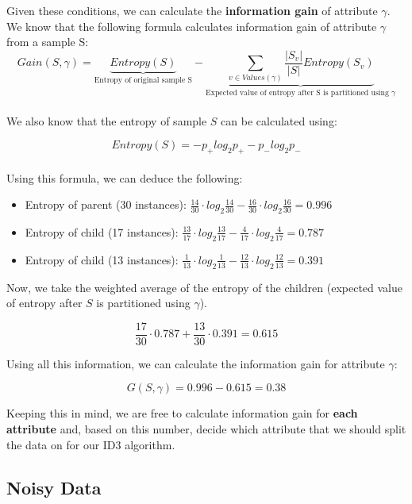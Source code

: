 \documentclass[english, 10pt]{article}
\begin{document}
{\begin{tikzpicture}[x=0.75pt,y=0.75pt,yscale=-1,xscale=1]
\end{tikzpicture}


}

\hfill \break Given these conditions, we can calculate the \textbf{information gain} of attribute $\gamma$.\\

We know that the following formula calculates information gain of attribute $\gamma$ from a sample S:\\

$$Gain(S,\gamma)=\underbrace{Entropy(S)}_{\text{Entropy of original sample S}}-\underbrace{\sum_{v\in Values(\gamma)}{\frac{|S_v|}{|S|}Entropy(S_v)}}_{\text{Expected value of entropy after S is partitioned using } \gamma}$$\\

We also know that the entropy of sample $S$ can be calculated using:

$$Entropy(S) = -p_+log_2p_+ - p_-log_2p_-$$\\

Using this formula, we can deduce the following:
\begin{itemize}
	\item Entropy of parent (30 instances): $\frac{14}{30}\cdot log_2 \frac{14}{30}-\frac{16}{30}\cdot log_2 \frac{16}{30}=0.996$
	\item Entropy of child (17 instances): $\frac{13}{17}\cdot log_2 \frac{13}{17} - \frac{4}{17} \cdot log_2 \frac{4}{17}=0.787$
	\item Entropy of child (13 instances): $\frac{1}{13}\cdot log_2 \frac{1}{13}-\frac{12}{13}\cdot log_2 \frac{12}{13}=0.391$
\end{itemize}

Now, we take the weighted average of the entropy of the children (expected value of entropy after $S$ is partitioned using $\gamma$).

$$\frac{17}{30}\cdot 0.787+\frac{13}{30}\cdot 0.391=0.615$$

\hfill \break Using all this information, we can calculate the information gain for attribute $\gamma$:

$$G(S,\gamma)=0.996-0.615=0.38$$

Keeping this in mind, we are free to calculate information gain for \textbf{each attribute} and, based on this number, decide which attribute that we should split the data on for our ID3 algorithm.\\

\subsection{Noisy Data}
\end{document}
